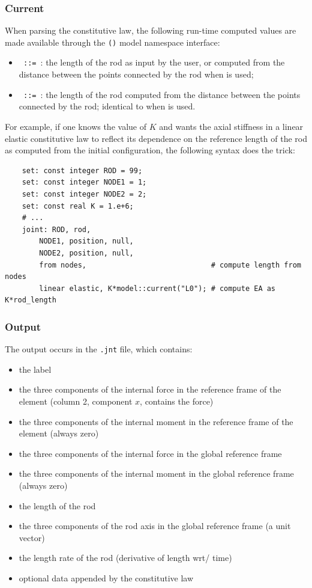 \subsubsection{Current}
When parsing the constitutive law, the following run-time computed values are made available
through the \texttt{()} model namespace interface:
\begin{itemize}
\item
{}\texttt{ ::= }:
the length of the rod  as input by the user,
or computed from the distance between the points connected by the rod when  is used;

\item
{}\texttt{ ::= }: 
the length of the rod computed from the distance between the points connected by the rod;
identical to  when  is used.
\end{itemize}
For example, if one knows the value of $K$ and wants the axial stiffness
in a linear elastic constitutive law to reflect its dependence
on the reference length of the rod as computed from the initial configuration,
the following syntax does the trick:
\begin{verbatim}
    set: const integer ROD = 99;
    set: const integer NODE1 = 1;
    set: const integer NODE2 = 2;
    set: const real K = 1.e+6;
    # ...
    joint: ROD, rod,
        NODE1, position, null,
        NODE2, position, null,
        from nodes,                             # compute length from nodes
        linear elastic, K*model::current("L0"); # compute EA as K*rod_length
\end{verbatim}



\subsubsection{Output}
The output occurs in the \texttt{.jnt} file, which contains:
\begin{itemize}
\item the label
\item the three components of the internal force in the reference frame
of the element (column 2, component $x$, contains the force)
\item the three components of the internal moment in the reference frame
of the element (always zero)
\item the three components of the internal force in the global
reference frame
\item the three components of the internal moment in the global
reference frame (always zero)
\item the length of the rod
\item the three components of the rod axis in the global reference frame
(a unit vector)
\item the length rate of the rod (derivative of length wrt/ time)
\item optional data appended by the constitutive law
\end{itemize}

